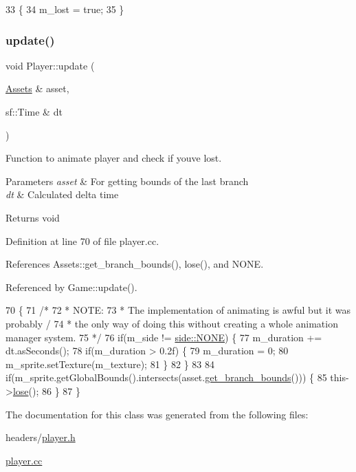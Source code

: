 \begin{DoxyCode}
33                   \{
34     m\_lost = \textcolor{keyword}{true};
35 \}
\end{DoxyCode}
\mbox{\label{class_player_a83282cabf0d698e16fe452759c50712c}} 
\subsubsection{\texorpdfstring{update()}{update()}}
{\footnotesize\ttfamily void Player\+::update (\begin{DoxyParamCaption}\item[{\hyperlink{class_assets}{Assets} \&}]{asset,  }\item[{sf\+::\+Time \&}]{dt }\end{DoxyParamCaption})}



Function to animate player and check if you\textquotesingle{}ve lost. 


\begin{DoxyParams}{Parameters}
{\em asset} & For getting bounds of the last branch \\
\hline
{\em dt} & Calculated delta time \\
\hline
\end{DoxyParams}
\begin{DoxyReturn}{Returns}
void 
\end{DoxyReturn}


Definition at line 70 of file player.\+cc.



References Assets\+::get\+\_\+branch\+\_\+bounds(), lose(), and N\+O\+NE.



Referenced by Game\+::update().


\begin{DoxyCode}
70                                              \{
71     \textcolor{comment}{/*}
72 \textcolor{comment}{     * NOTE:}
73 \textcolor{comment}{     * The implementation of animating is awful but it was probably /}
74 \textcolor{comment}{     * the only way of doing this without creating a whole animation manager system.}
75 \textcolor{comment}{     */}
76     \textcolor{keywordflow}{if}(m\_side != \hyperlink{assets_8h_afc015eff6557e84151d2e53b94375445ab50339a10e1de285ac99d4c3990b8693}{side::NONE}) \{
77         m\_duration += dt.asSeconds();
78         \textcolor{keywordflow}{if}(m\_duration > 0.2f) \{
79             m\_duration = 0;
80             m\_sprite.setTexture(m\_texture);
81         \}
82     \}
83     
84     \textcolor{keywordflow}{if}(m\_sprite.getGlobalBounds().intersects(asset.\hyperlink{class_assets_aac229701c6bc1d67c56a1e607658d923}{get\_branch\_bounds}())) \{
85         this->\hyperlink{class_player_af1ae3d8d7e22c5502d0380c16c7329ef}{lose}();
86     \}
87 \}
\end{DoxyCode}


The documentation for this class was generated from the following files\+:\begin{DoxyCompactItemize}
\item 
headers/\hyperlink{player_8h}{player.\+h}\item 
\hyperlink{player_8cc}{player.\+cc}\end{DoxyCompactItemize}
